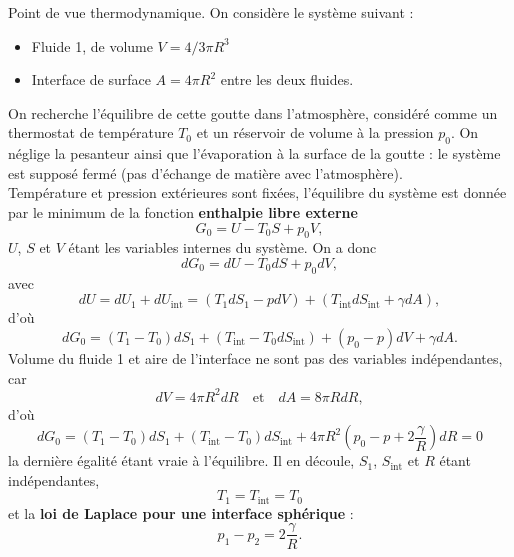 \documentclass[11pt,a4paper]{report}
\begin{document}
Point de vue thermodynamique. On considère le système suivant :
\begin{itemize}
	\item Fluide 1, de volume $V = 4/3 \pi R^3$
	\item Interface de surface $A = 4\pi R^2$ entre les deux fluides.\\
\end{itemize}

On recherche l'équilibre de cette goutte dans l'atmosphère, considéré comme un thermostat de température $T_0$ et un réservoir de volume à la pression $p_0$. On néglige la pesanteur ainsi que l'évaporation à la surface de la goutte : le système est supposé fermé (pas d'échange de matière avec l'atmosphère).\\

Température et pression extérieures sont fixées, l'équilibre du système est donnée par le minimum de la fonction \textbf{enthalpie libre externe}
\begin{equation}
	\boxed{G_0 = U - T_0 S + p_0 V},
\end{equation} 
$U$, $S$ et $V$ étant les variables internes du système. On a donc
\begin{equation}
	dG_0 = dU - T_0 dS + p_0 dV,
\end{equation}
avec
\begin{equation}
	dU = dU_1+dU_\text{int}=\left(T_1 dS_1-pdV\right)
	+\left(T_\text{int}dS_\text{int}+\gamma dA\right),
\end{equation}
d'où
\begin{equation}
	dG_0 = \left(T_1 - T_0\right)dS_1 + \left(T_\text{int} - T_0 dS_\text{int}\right)
	+\left(p_0 - p\right)dV + \gamma dA.
\end{equation}
Volume du fluide 1 et aire de l'interface ne sont pas des variables indépendantes, car
\begin{equation}
	dV = 4\pi R^2 dR \quad\text{et}\quad dA = 8\pi R dR, 
\end{equation}
d'où
\begin{equation}
	dG_0 = \left(T_1 - T_0 \right)dS_1 
	+ \left(T_\text{int} - T_0 \right)dS_\text{int}
	+ 4\pi R^2 \left(p_0 - p + 2\frac{\gamma}{R}\right) dR = 0
\end{equation}
la dernière égalité étant vraie à l'équilibre. Il en découle, $S_1$, $S_\text{int}$ et $R$ étant indépendantes,
\begin{equation}
	T_1 = T_\text{int} = T_0
\end{equation}
et la \textbf{loi de Laplace pour une interface sphérique} :
\begin{equation}
	\boxed{p_1 - p_2 = 2\frac{\gamma}{R}}.
\end{equation}
\end{document}
